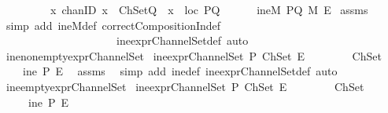 \begin{isabellebody}
\ \ \ \ \ \ \ \ {\isachardoublequoteopen}{\isasymforall}\ {\isacharparenleft}x\ {\isacharcolon}{\isacharcolon}chanID{\isacharparenright}{\isachardot}\ {\isacharparenleft}{\isacharparenleft}x\ {\isasymin}\ ChSetQ{\isacharparenright}\ {\isasymlongrightarrow}\ {\isacharparenleft}x\ {\isasymin}\ {\isacharparenleft}loc\ PQ{\isacharparenright}{\isacharparenright}{\isacharparenright}{\isachardoublequoteclose}\isanewline
{}\ \ \ \ {\isachardoublequoteopen}\ {\isasymnot}\ ineM\ PQ\ M\ E{\isachardoublequoteclose}\isanewline
%
\isadelimproof
%
\endisadelimproof
%
\isatagproof
{}\isamarkupfalse%
\ assms\ \isanewline
{}\isamarkupfalse%
\ {\isacharparenleft}simp\ add{\isacharcolon}\ ineM{\isacharunderscore}def\ correctCompositionIn{\isacharunderscore}def\ \isanewline
\ \ \ \ \ \ \ \ \ \ \ \ \ \ \ \ \ \ \ \ \ ine{\isacharunderscore}exprChannelSet{\isacharunderscore}def{\isacharcomma}\ auto{\isacharparenright}%
\endisatagproof
{\isafoldproof}%
%
\isadelimproof
\ \isanewline
%
\endisadelimproof
\isanewline
{}\isamarkupfalse%
\ ine{\isacharunderscore}nonempty{\isacharunderscore}exprChannelSet{\isacharcolon}\isanewline
{}\ {\isachardoublequoteopen}ine{\isacharunderscore}exprChannelSet\ P\ ChSet\ E{\isachardoublequoteclose}\isanewline
\ \ \ \ \ \ \ \ {\isachardoublequoteopen}ChSet\ {\isasymnoteq}\ {\isacharbraceleft}{\isacharbraceright}{\isachardoublequoteclose}\isanewline
{}\ \ \ \ {\isachardoublequoteopen}ine\ P\ E\ {\isachardoublequoteclose}\isanewline
%
\isadelimproof
%
\endisadelimproof
%
\isatagproof
{}\isamarkupfalse%
\ assms\ \isamarkupfalse%
\ {\isacharparenleft}simp\ add{\isacharcolon}\ ine{\isacharunderscore}def\ ine{\isacharunderscore}exprChannelSet{\isacharunderscore}def{\isacharcomma}\ auto{\isacharparenright}%
\endisatagproof
{\isafoldproof}%
%
\isadelimproof
\isanewline
%
\endisadelimproof
\isanewline
{}\isamarkupfalse%
\ ine{\isacharunderscore}empty{\isacharunderscore}exprChannelSet{\isacharcolon}\isanewline
{}\ {\isachardoublequoteopen}ine{\isacharunderscore}exprChannelSet\ P\ ChSet\ E{\isachardoublequoteclose}\isanewline
\ \ \ \ \ \ \ \ {\isachardoublequoteopen}ChSet\ {\isacharequal}\ {\isacharbraceleft}{\isacharbraceright}{\isachardoublequoteclose}\isanewline
{}\ \ \ \ {\isachardoublequoteopen}{\isasymnot}\ ine\ P\ E{\isachardoublequoteclose}\isanewline
%
\isadelimproof
%
\endisadelimproof
%
\isatagproof
{}\isamarkupfalse%

\end{isabellebody}
